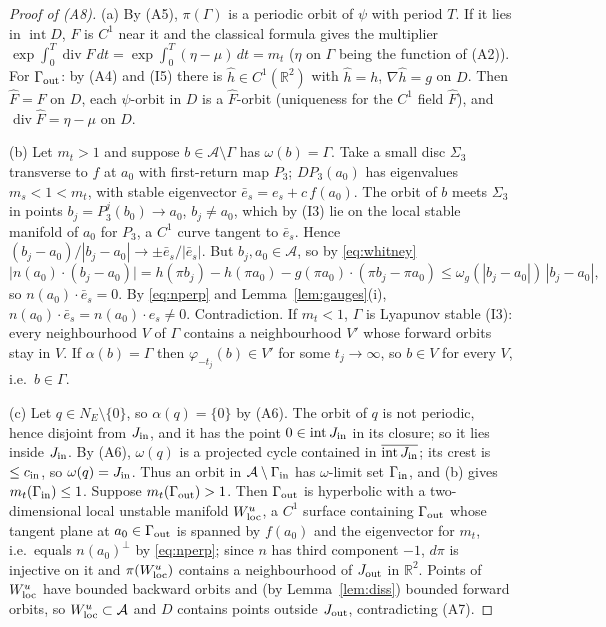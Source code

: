 \documentclass[11pt,a4paper]{article}
\numberwithin{equation}{section}
\theoremstyle{remark}\newtheorem{remark}[theorem]{Remark}
\newcommand{\R}{\mathbb R}
\newcommand{\cA}{\mathcal A}
\DeclareMathOperator{\inter}{int}
\DeclareMathOperator{\diver}{div}
\begin{document}
\begin{proof}[Proof of (A8)]
(a) By (A5), $\pi(\Gamma)$ is a periodic orbit of $\psi$ with period $T$. If it lies in $\inter D$, $F$ is $C^1$
near it and the classical formula gives the multiplier $\exp\int_0^T\diver F\,dt=\exp\int_0^T(\eta-\mu)\,dt=m_t$
($\eta$ on $\Gamma$ being the function of (A2)). For $\Gamma_{\rm out}$: by (A4) and (I5) there is
$\widehat h\in C^1(\R^2)$ with $\widehat h=h$, $\nabla\widehat h=g$ on $D$. Then $\widehat F=F$ on $D$, each
$\psi$-orbit in $D$ is a $\widehat F$-orbit (uniqueness for the $C^1$ field $\widehat F$), and
$\diver\widehat F=\eta-\mu$ on $D$.

(b) Let $m_t>1$ and suppose $b\in\cA\setminus\Gamma$ has $\omega(b)=\Gamma$. Take a small disc $\Sigma_3$ transverse
to $f$ at $a_0$ with first-return map $P_3$; $DP_3(a_0)$ has eigenvalues $m_s<1<m_t$, with stable eigenvector
$\bar e_s=e_s+c\,f(a_0)$. The orbit of $b$ meets $\Sigma_3$ in points $b_j=P_3^j(b_0)\to a_0$, $b_j\ne a_0$, which by
(I3) lie on the local stable manifold of $a_0$ for $P_3$, a $C^1$ curve tangent to $\bar e_s$. Hence
$(b_j-a_0)/|b_j-a_0|\to\pm\bar e_s/|\bar e_s|$. But $b_j,a_0\in\cA$, so by \eqref{eq:whitney}
\[
\bigl|n(a_0)\cdot(b_j-a_0)\bigr|=h(\pi b_j)-h(\pi a_0)-g(\pi a_0)\cdot(\pi b_j-\pi a_0)\le\omega_g(|b_j-a_0|)\,|b_j-a_0| ,
\]
so $n(a_0)\cdot\bar e_s=0$. By \eqref{eq:nperp} and Lemma~\ref{lem:gauges}(i), $n(a_0)\cdot\bar e_s=n(a_0)\cdot
e_s\ne0$. Contradiction. If $m_t<1$, $\Gamma$ is Lyapunov stable (I3): every neighbourhood $V$ of $\Gamma$ contains a
neighbourhood $V'$ whose forward orbits stay in $V$. If $\alpha(b)=\Gamma$ then $\varphi_{-t_j}(b)\in V'$ for some
$t_j\to\infty$, so $b\in V$ for every $V$, i.e.\ $b\in\Gamma$.

(c) Let $q\in N_E\setminus\{0\}$, so $\alpha(q)=\{0\}$ by (A6). The orbit of $q$ is not periodic, hence disjoint from
$J_{\rm in}$, and it has the point $0\in\operatorname{int}J_{\rm in}$ in its closure; so it lies inside
$J_{\rm in}$. By (A6), $\omega(q)$ is a projected cycle contained in $\overline{\operatorname{int}J_{\rm in}}$; its
crest is $\le c_{\rm in}$, so $\omega(q)=J_{\rm in}$. Thus an orbit in $\cA\setminus\Gamma_{\rm in}$ has
$\omega$-limit set $\Gamma_{\rm in}$, and (b) gives $m_t(\Gamma_{\rm in})\le1$. Suppose
$m_t(\Gamma_{\rm out})>1$. Then $\Gamma_{\rm out}$ is hyperbolic with a two-dimensional local unstable manifold
$W^u_{\rm loc}$, a $C^1$ surface containing $\Gamma_{\rm out}$ whose tangent plane at $a_0\in\Gamma_{\rm out}$ is
spanned by $f(a_0)$ and the eigenvector for $m_t$, i.e.\ equals $n(a_0)^\perp$ by \eqref{eq:nperp}; since $n$ has
third component $-1$, $d\pi$ is injective on it and $\pi(W^u_{\rm loc})$ contains a neighbourhood of
$J_{\rm out}$ in $\R^2$. Points of $W^u_{\rm loc}$ have bounded backward orbits and (by Lemma~\ref{lem:diss})
bounded forward orbits, so $W^u_{\rm loc}\subset\cA$ and $D$ contains points outside $J_{\rm out}$, contradicting
(A7).


\end{proof}
\end{document}
